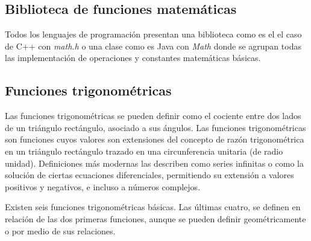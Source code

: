 \subsection{Biblioteca de funciones matemáticas}
Todos los lenguajes de programación presentan una biblioteca como es el el caso de C++ con \emph{math.h} o una clase como es Java con \emph{Math} donde se agrupan todas las implementación de operaciones y constantes matemáticas básicas.

\subsection{Funciones trigonométricas}
Las funciones trigonométricas se pueden definir como el cociente entre dos lados de un triángulo rectángulo, asociado a sus ángulos. Las funciones trigonométricas son funciones cuyos valores son extensiones del concepto de razón trigonométrica en un triángulo rectángulo trazado en una circunferencia unitaria (de radio unidad). Definiciones más modernas las describen como series infinitas o como la solución de ciertas ecuaciones diferenciales, permitiendo su extensión a valores positivos y negativos, e incluso a números complejos. 

Existen seis funciones trigonométricas básicas. Las últimas cuatro, se definen en relación de las dos primeras funciones, aunque se pueden definir geométricamente o por medio de sus relaciones. 